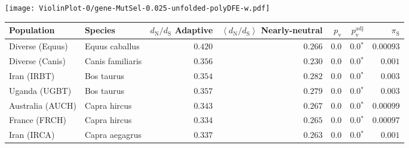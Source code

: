 \begin{center}
\begin{adjustbox}{width = 1\textwidth}
\begin{tabular}{|l|l|r|r|r|r|r|r|r|}
\bottomrule
\end{tabular}
\end{adjustbox}
\newpage
\texttt{[image: ViolinPlot-0/gene-MutSel-0.025-unfolded-polyDFE-w.pdf]} 
\begin{adjustbox}{width = 1\textwidth}
\begin{tabular}{|l|l|r|r|r|r|r|}
\toprule
                     Population &              Species & \specialcell{$d_{\mathrm{N}} / d_{\mathrm{S}}$ \\ Adaptive} & \specialcell{$\left< d_{\mathrm{N}} / d_{\mathrm{S}} \right>$ \\ Nearly-neutral} & $p_{\mathrm{v}}$ & $p_{\mathrm{v}}^{\mathrm{adj}}$ & $\pi_{\textrm{S}}$ \\
\midrule
                Diverse (Equus) &       Equus caballus &                                           $ 0.420$ &                                           $ 0.266$ &            $0.0$ &                  $\bm{0.0{^*}}$ &          $0.00093$ \\
                Diverse (Canis) &     Canis familiaris &                                           $ 0.356$ &                                           $ 0.230$ &            $0.0$ &                  $\bm{0.0{^*}}$ &           $ 0.001$ \\
                    Iran (IRBT) &           Bos taurus &                                           $ 0.354$ &                                           $ 0.282$ &            $0.0$ &                  $\bm{0.0{^*}}$ &           $ 0.003$ \\
                  Uganda (UGBT) &           Bos taurus &                                           $ 0.357$ &                                           $ 0.279$ &            $0.0$ &                  $\bm{0.0{^*}}$ &           $ 0.003$ \\
               Australia (AUCH) &         Capra hircus &                                           $ 0.343$ &                                           $ 0.267$ &            $0.0$ &                  $\bm{0.0{^*}}$ &          $0.00099$ \\
                  France (FRCH) &         Capra hircus &                                           $ 0.334$ &                                           $ 0.265$ &            $0.0$ &                  $\bm{0.0{^*}}$ &          $0.00097$ \\
                    Iran (IRCA) &       Capra aegagrus &                                           $ 0.337$ &                                           $ 0.263$ &            $0.0$ &                  $\bm{0.0{^*}}$ &           $ 0.001$ \\

\end{tabular}
\end{adjustbox}
\end{center}
